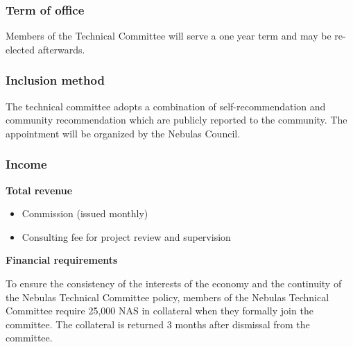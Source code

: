 \subsubsection{Term of office}

Members of the Technical Committee will serve a one year term and may be re-elected afterwards.

\subsubsection{Inclusion method}

The technical committee adopts a combination of self-recommendation and community recommendation which are publicly reported to the community. The appointment will be organized by the Nebulas Council.


\subsubsection{Income}

\textbf{Total revenue}

\begin{itemize}
	\item Commission (issued monthly)
	\item Consulting fee for project review and supervision
\end{itemize}

\vspace{2em}

\textbf{Financial requirements}

To ensure the consistency of the interests of the economy and the continuity of the Nebulas Technical Committee policy, members of the Nebulas Technical Committee require 25,000 NAS in collateral when they formally join the committee. The collateral is returned 3 months after dismissal from the committee.

